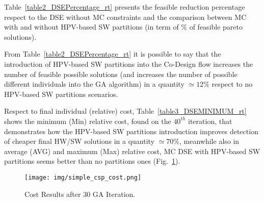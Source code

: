 %
Table~\ref{table2_DSEPercentage_rt} presents the feasible reduction percentage respect to the DSE without MC constraints and the comparison between MC with and without HPV-based SW partitions (in term of \% of feasible pareto solutions). \par
%
\begin{table}[htbp]
\caption{DSE percentage reduction of feasible solutions}
\begin{center}
\label{table2_DSEPercentage_rt}
\end{center}
\end{table}
%
From Table~\ref{table2_DSEPercentage_rt} it is possible to say that the introduction of HPV-based SW partitions into the Co-Design flow increases the number of feasible possible solutions (and increases the number of possible different individuals into the GA algorithm) in a quantity $\simeq 12 \%$ respect to no HPV-based SW partitions scenarios. \par 
%
\begin{table}[htbp]
\caption{DSE minimum (relative) cost analysis}
\begin{center}
\label{table3_DSEMINIMUM_rt}
\end{center}
\end{table}
%
Respect to final individual (relative) cost, Table~\ref{table3_DSEMINIMUM_rt} shows the minimum (Min) relative cost, found on the $40^{th}$ iteration, that demonstrates how the HPV-based SW partitions introduction improves detection of cheaper final HW/SW solutions in a quantity $\simeq 70\%$, meanwhile also in average (AVG) and maximum (Max) relative cost, MC DSE with HPV-based SW partitions seems better than no partitions ones (Fig.~\ref{fig8_rt}).
%
\begin{figure}[htbp]
	\centerline{\texttt{[image: img/simple\_csp\_cost.png]}}
	\caption{Cost Results after 30 GA Iteration.}
	\label{fig8_rt}
\end{figure}
%
